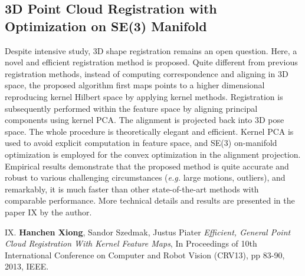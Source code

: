 \subsection{3D Point Cloud Registration with Optimization on SE(3) Manifold} 
Despite intensive study, 3D shape
registration remains an open question. 
Here, a novel and efficient registration method is proposed. 
Quite
different from previous registration methods, instead of computing
correspondence and aligning in 3D space, the proposed algorithm first maps 
points to a higher dimensional reproducing  kernel Hilbert space by applying
kernel methods. Registration is subsequently performed within the feature
space by aligning principal components using kernel PCA. The alignment is
projected back into 3D pose space. The whole procedure is
theoretically elegant and efficient. Kernel PCA is used to avoid
explicit computation in feature space, and SE(3) on-manifold
optimization is employed for the convex optimization in the alignment projection. 
Empirical results demonstrate that the proposed method is quite accurate
and robust to various challenging circumstances (\emph{e.g.} large motions,
outliers), and remarkably, it is much faster than other
state-of-the-art methods with comparable performance. 
More technical details and results are presented in the paper IX by the author. 


\begin{shaded}
 {\Huge IX.} \textbf{Hanchen Xiong}, Sandor Szedmak, Justus Piater {\it Efficient, General Point Cloud Registration With Kernel Feature Maps}, 
In Proceedings of 10th International Conference on Computer and Robot Vision (CRV13), pp 83-90, 2013, IEEE.
\end{shaded}





%
%
%
%

